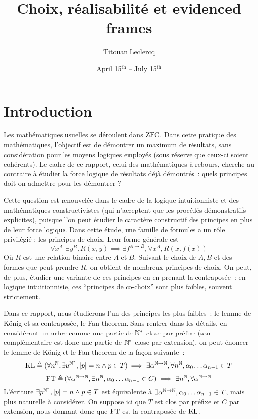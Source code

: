 \documentclass{article}
\title{Choix, réalisabilité et evidenced frames}
\author{Titouan Leclercq}
\date{April 15$^{\mathrm{th}}$ -- July 15$^{\mathrm{th}}$}
\begin{document}
\maketitle

\tableofcontents

\section{Introduction}

Les mathématiques usuelles se déroulent dans $\mathrm{ZFC}$. Dans cette pratique des mathématiques, l'objectif est de démontrer un maximum de résultats, sans considération pour les moyens logiques employés (sous réserve que ceux-ci soient cohérents). Le cadre de ce rapport, celui des mathématiques à rebours, cherche au contraire à étudier la force logique de résultats déjà démontrés~: quels principes doit-on admettre pour les démontrer ?

Cette question est renouvelée dans le cadre de la logique intuitionniste et des mathématiques constructivistes (qui n'acceptent que les procédés démonstratifs explicites), puisque l'on peut étudier le caractère constructif des principes en plus de leur force logique. Dans cette étude, une famille de formules a un rôle privilégié : les principes de choix. Leur forme générale est
\[\forall x^A, \exists y^B, R(x,y) \implies \exists f^{A\to B}, \forall x^A, R(x,f(x))\]
Où $R$ est une relation binaire entre $A$ et $B$. Suivant le choix de $A,B$ et des formes que peut prendre $R$, on obtient de nombreux principes de choix. On peut, de plus, étudier une variante de ces principes en en prenant la contraposée~: en logique intuitionniste, ces ``principes de co-choix'' sont plus faibles, souvent strictement.

Dans ce rapport, nous étudierons l'un des principes les plus faibles~: le lemme de König et sa contraposée, le Fan theorem. Sans rentrer dans les détails, en considérant un arbre comme une partie de $\mathbb{N}^*$ close par préfixe (son complémentaire est donc une partie de $\mathbb{N}^*$ close par extension), on peut énoncer le lemme de König et le Fan theorem de la façon suivante~:
\[\mathrm{KL} \triangleq (\forall n^{\mathbb{N}}, \exists u^{\mathbb{N}^*}, |p| = n \land p \in T) \implies \exists \alpha^{\mathbb{N}\to\mathbb{N}}, \forall n^{\mathbb{N}}, \alpha_0\ldots\alpha_{n-1}\in T\]
\[\mathrm{FT} \triangleq (\forall \alpha^{\mathbb{N}\to\mathbb{N}}, \exists n^{\mathbb{N}}, \alpha_0\ldots \alpha_{n-1}\in C)\implies \exists n^{\mathbb{N}}, \forall \alpha^{\mathbb{N}\to\mathbb{N}}\]
L'écriture $\exists p^{\mathbb{N}^*},|p| = n \land p \in T$ est équivalente à $\exists \alpha^{\mathbb{N}\to\mathbb{N}}, \alpha_0\ldots\alpha_{n-1}\in T$, mais plus naturelle à considérer. On suppose ici que $T$ est clos par préfixe et $C$ par extension, nous donnant donc que $\mathrm{FT}$ est la contraposée de $\mathrm{KL}$.
\end{document}
